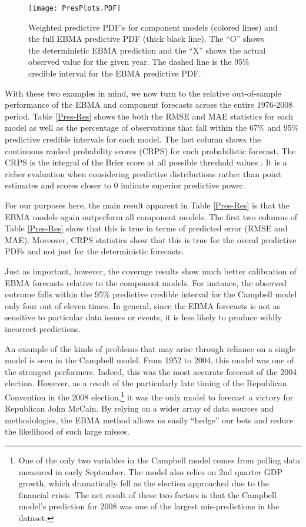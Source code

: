 \documentclass[pdftex,12pt,fullpage,oneside]{amsart}
\begin{document}
\begin{figure}[ht!]
  \caption{\footnotesize Weighted predictive PDF's for component
    models (colored lines) and the full EBMA predictive PDF (thick
    black line).  The ``O'' shows the deterministic EBMA prediction
    and the ``X'' shows the actual observed value for the given year.
    The dashed line is the 95\% credible interval for the EBMA
    predictive PDF.}
\label{PresPlots}
\begin{center}
\texttt{[image: PresPlots.PDF]}
\end{center}
\end{figure}

With these two examples in mind, we now turn to the relative
out-of-sample performance of the EBMA and component forecasts across
the entire 1976-2008 period.  Table \ref{Pres-Res} shows the both the
RMSE and MAE statistics for each model as well as the percentage of
observations that fall within the 67\% and 95\% predictive credible
intervals for each model.  The last column shows the continuous ranked
probability scores (CRPS) for each probabilistic forecast.  The CRPS
is the integral of the Brier score at all possible threshold values
\citep{Hersbach:2000}.  It is a richer evaluation when considering
predictive distributions rather than point estimates and scores closer
to 0 indicate superior predictive power.  

For our purposes here, the main result apparent in Table
\ref{Pres-Res} is that the EBMA models again outperform all component
models.  The first two columns of Table \ref{Pres-Res} show that this
is true in terms of predicted error (RMSE and MAE).  Moreover, CRPS
statistics show that this is true for the overal predictive PDFs and
not just for the deterministic forecasts.

Just as important, however, the coverage results show much better
calibration of EBMA forecasts relative to the component models.  For
instance, the observed outcome falls within the 95\% predictive
credible interval for the Campbell model only four out of eleven
times.  In general, since the EBMA forecasts is not as sensitive to
particular data issues or events, it is less likely to produce wildly
incorrect predictions.  

An example of the kinds of problems that may arise through reliance on
a single model is seen in the Campbell model.  From 1952 to 2004, this
model was one of the strongest performers.  Indeed, this was the most
accurate forecast of the 2004 election.  However, as a result of the
particularly late timing of the Republican Convention in the 2008
election,\footnote{One of the only two variables in the Campbell model
  comes from polling data measured in early September.  The model also
  relies on 2nd quarter GDP growth, which dramatically fell as the
  election approached due to the financial crisis.  The net result of
  these two factors is that the Campbell model's prediction for 2008
  was one of the largest mis-predictions in the dataset.} it was the
only model to forecast a victory for Republican John McCain.  By
relying on a wider array of data sources and methodologies, the EBMA
method allows us easily ``hedge'' our bets and reduce the likelihood
of such large misses.
\end{document}
